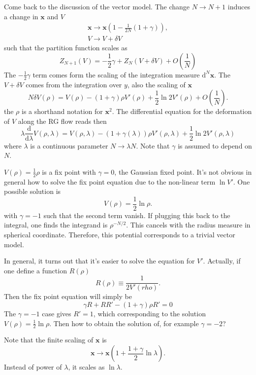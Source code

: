 Come back to the discussion of the vector model.
The change $N\to N+1 $ induces a change in $\mathbf{x}$ and $V$
\begin{align}
	\mathbf{x} \to \mathbf{x} \left(1- \frac{1}{2N}(1+\gamma)\right),\\
	V \to V + \delta V
\end{align}
such that the partition function scales as
\begin{equation}
	Z_{N+1}(V) = -\frac{1}{2} \gamma + Z_N(V+\delta V) + O(\frac{1}{N})
\end{equation}
The $-\frac{1}{2}\gamma$ term comes form the scaling of the integration measure $\mathrm{d}^N \mathbf{x}$.
The $V+\delta V$ comes from the integration over $y$, also the scaling of $\mathbf{x}$
\[
N \delta V (\rho) = V(\rho) - (1+\gamma) \rho V'(\rho) + \frac{1}{2} \ln 2 V'(\rho) + O(\frac{1}{N})
.\] 
the $\rho$ is a shorthand notation for $\mathbf{x}^2$.
The differential equation for the deformation of $V$ along the RG flow reads then
\begin{equation}
	\lambda \frac{\mathrm{d}}{\mathrm{d} \lambda} V(\rho,\lambda) = V(\rho,\lambda) - \left(1+\gamma(\lambda)\right) \rho V'(\rho,\lambda) + \frac{1}{2} \ln 2V'(\rho,\lambda)
\end{equation}
where $\lambda$ is a continuous parameter $N\to \lambda N$.
Note that $\gamma$ is assumed to depend on $N$.


$V(\rho) = \frac{1}{2} \rho$ is a fix point with $\gamma=0$, the Gaussian fixed point.
It's not obvious in general how to solve the fix point equation due to the non-linear term $\ln V'$.
One possible solution is
\[
V(\rho) = \frac{1}{2} \ln \rho
.\] 
with $\gamma=-1$ such that the second term vanish.
If plugging this back to the integral, one finds the integrand is $\rho^{- N / 2}$.
This cancels with the radius measure in spherical coordinate.
Therefore, this potential corresponds to a trivial vector model.

In general, it turns out that it's easier to solve the equation for $V'$.
Actually, if one define a function $R(\rho)$
\[
R(\rho) \equiv \frac{1}{2 V'(rho)}
.\] 
Then the fix point equation will simply be
\begin{equation}
	\gamma R + R R' - (1 + \gamma) \rho R' = 0
\end{equation}
The $\gamma = -1$ case gives $R'=1$, which corresponding to the solution $V(\rho)=\frac{1}{2}\ln\rho$.
Then how to obtain the solution of, for example $\gamma=-2$?

Note that the finite scaling of $\mathbf{x}$ is
\[
\mathbf{x} \to \mathbf{x} \left(1 + \frac{1 + \gamma}{2} \ln \lambda\right)
.\] 
Instead of power of $\lambda$, it scales as $\ln \lambda$.

